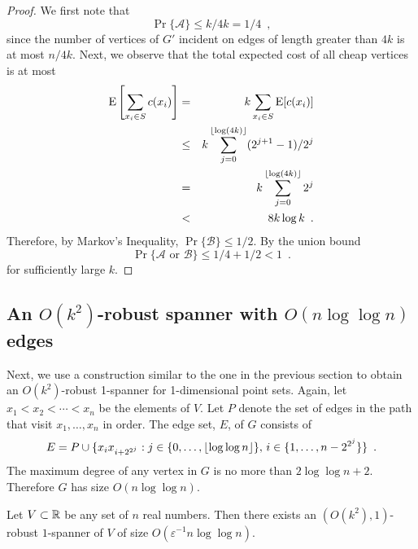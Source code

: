 \documentclass{patmorin}
\begin{document}
\begin{proof}
We first note that 
\[
   \Pr\{\mathcal{A}\} \le k/4k = 1/4 \enspace ,
\]
since the number of vertices of $G'$ incident on edges of length greater
than $4k$ is at most $n/4k$.  
Next, we observe that the total expected cost of all cheap vertices is at most
\begin{eqnarray*}
   \mathrm{E}\left[\sum_{x_i\in S}c(x_i) \right] 
  &=& k\sum_{x_i\in S}\mathrm{E}[c(x_i)]  \\
  &\le&  k\sum_{j=0}^{{\lfloor \log (4k) \rfloor}} (2^{j+1}-1)/2^j \\
   &=& k\sum_{j=0}^{{\lfloor \log (4k) \rfloor}} 2^j \\
   &<& 8k\log k \enspace .
\end{eqnarray*}
Therefore, by Markov's Inequality, $\Pr\{\mathcal{B}\}\le 1/2$.
By the union bound
\[
   \Pr\{\mbox{$\mathcal{A}$ or $\mathcal{B}$}\} \le 1/4+ 1/2 < 1
\enspace .
\]
for sufficiently large $k$.
\end{proof}


\newcommand{\eps}{\varepsilon}

\subsection{An $O(k^{2})$-robust spanner with $O(n\log\log n)$ edges}

Next, we use a construction similar to the one in the previous section to
obtain an $O(k^2)$-robust 1-spanner for 1-dimensional point sets.
Again, let $x_1<x_2<\cdots<x_n$ be the elements of $V$.  Let $P$ denote the
set of edges in the path that visit $x_1,\ldots,x_n$ in order.
The edge set,
$E$, of $G$ consists of
\[
  E =  P 
      \cup \{x_ix_{i+2^{2^j}} :
               j\in\{0,\ldots,{\lfloor \log\log n \rfloor}\},\, i\in\{1,\ldots,n-2^{2^j}\} \} \\
\enspace .
\]
The maximum degree of any vertex in $G$ is no more than $2\log\log
n+2$. Therefore $G$ has size $O(n\log\log n)$.

\begin{thm}
Let $V\subset \mathbb{R}$ be any set of $n$ real numbers.  Then there exists an
$(O(k^2),1)$-robust $1$-spanner of $V$ of size $O(\eps^{-1}n\log\log n)$.
\end{thm}
\end{document}

